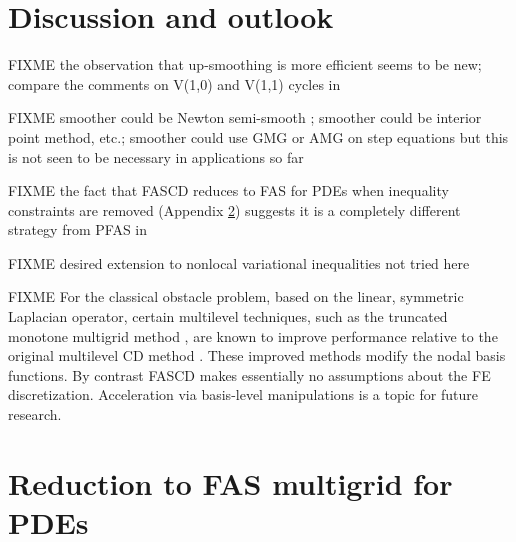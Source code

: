 \documentclass[letterpaper,final,12pt,reqno]{amsart}
\theoremstyle{cstyle}
\theoremstyle{cstyle*}
\theoremstyle{dstyle}
\numberwithin{equation}{section}
\numberwithin{figure}{section}
\numberwithin{table}{section}
\numberwithin{theorem}{section}
\begin{document}
\section{Discussion and outlook} \label{sec:discussion}

FIXME the observation that up-smoothing is more efficient seems to be new; compare the comments on V(1,0) and V(1,1) cycles in \cite{GraeserKornhuber2009,Tai2003}

FIXME smoother could be Newton semi-smooth \cite{BensonMunson2006}; smoother could be interior point method, etc.; smoother could use GMG or AMG on step equations but this is not seen to be necessary in applications so far

FIXME the fact that FASCD reduces to FAS for PDEs when inequality constraints are removed (Appendix \ref{app:reductions}) suggests it is a completely different strategy from PFAS in \cite{BrandtCryer1983}

FIXME desired extension to nonlocal variational inequalities not tried here

FIXME For the classical obstacle problem, based on the linear, symmetric Laplacian operator, certain multilevel techniques, such as the truncated monotone multigrid method \cite{GraeserKornhuber2009,Kornhuber1994}, are known to improve performance relative to the original multilevel CD method \cite{Tai2003}.  These improved methods modify the nodal basis functions.  By contrast FASCD makes essentially no assumptions about the FE discretization.  Acceleration via basis-level manipulations is a topic for future research.






\appendix
\section{Reduction to FAS multigrid for PDEs} \label{app:reductions}
\end{document}
